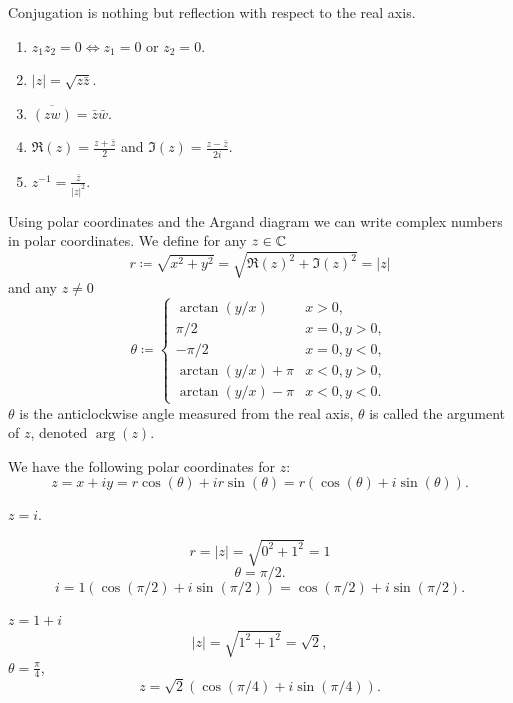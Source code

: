 \documentclass[10pt, a4paper]{article}
\begin{document}
Conjugation is nothing but reflection with respect to the real axis.

\begin{lemma}
    \begin{enumerate}[label = (\roman*)]
        \item $z_1z_2 = 0 \iff z_1 = 0\text{ or } z_2 = 0$.

        \item $|z| = \sqrt{z\bar{z}}$.

        \item $\overline{(zw)} = \bar{z}\bar{w}$.

        \item $\Re(z) = \frac{z + \bar{z}}{2}$ and $\Im(z) = \frac{z - \bar{z}}{2i}$.

        \item $z ^ {-1} = \frac{\bar{z}}{|z| ^ 2}$.
    \end{enumerate}
\end{lemma}

Using polar coordinates and the Argand diagram we can write complex numbers in polar coordinates.
We define for any $z \in \mathbb{C}$
\[
r \coloneqq \sqrt{x ^ 2 + y ^ 2} = \sqrt{\Re(z) ^ 2+ \Im(z) ^ 2} = |z|
\]
and any $z \neq 0$
\[
\theta \coloneqq \begin{cases}
    \arctan(y / x) & x > 0, \\
    \pi / 2 & x = 0, y > 0, \\
    -\pi / 2 & x = 0, y < 0, \\
    \arctan(y / x) + \pi &x < 0, y > 0, \\
    \arctan(y / x) - \pi &x < 0, y < 0.
\end{cases}
\]
$\theta$ is the anticlockwise angle measured from the real axis,
$\theta$ is called the argument of $z$,
denoted $\arg(z)$.

We have the following polar coordinates for $z$:
\[
z = x + iy = r\cos(\theta) + ir\sin(\theta) = r(\cos(\theta) + i\sin(\theta)).
\]

\begin{example}
    $z = i$.

    \[
    r = |z| = \sqrt{0 ^ 2 + 1 ^ 2} = 1
    \]
    \[
    \theta = \pi / 2.
    \]
    \[
    i = 1(\cos(\pi / 2) + i\sin(\pi / 2)) = \cos(\pi / 2) + i\sin(\pi / 2).
    \]

    $z = 1 + i$
    \[
    |z| = \sqrt{1 ^ 2 + 1 ^ 2} = \sqrt{2},
    \]
    $\theta = \frac{\pi}{4}$,
    \[
    z = \sqrt{2}(\cos(\pi / 4) + i\sin(\pi / 4)).
    \]
\end{example}
\end{document}
